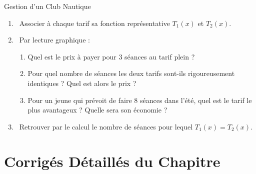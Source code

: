 \begin{sujetdnb}{Gestion d'un Club Nautique}
\begin{enumerate}
    \item \capSApproprier\ Associer à chaque tarif sa fonction représentative $T_1(x)$ et $T_2(x)$.
    \item \capAnalyser\ Par lecture graphique :
    \begin{enumerate}
        \item Quel est le prix à payer pour 3 séances au tarif plein ?
        \item Pour quel nombre de séances les deux tarifs sont-ils rigoureusement identiques ? Quel est alors le prix ?
        \item Pour un jeune qui prévoit de faire 8 séances dans l'été, quel est le tarif le plus avantageux ? Quelle sera son économie ?
    \end{enumerate}
    \item \capRealiser\ Retrouver par le calcul le nombre de séances pour lequel $T_1(x) = T_2(x)$.
\end{enumerate}
\lignesreponse[7]
\end{sujetdnb}

\section{Corrigés Détaillés du Chapitre}


